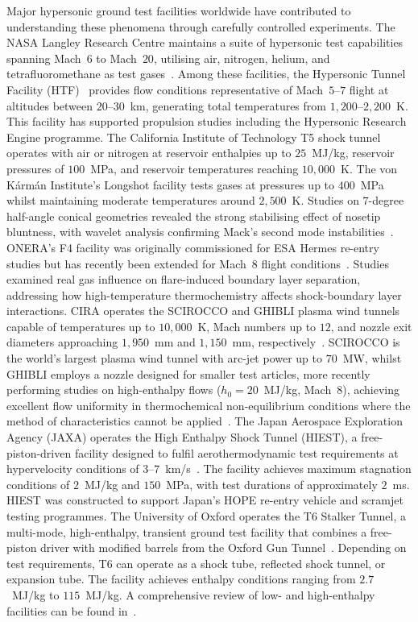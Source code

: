 Major hypersonic ground test facilities worldwide have contributed to understanding these phenomena through carefully controlled experiments. The \gls{NASA} Langley Research Centre maintains a suite of hypersonic test capabilities spanning Mach~$6$ to Mach~$20$, utilising air, nitrogen, helium, and tetrafluoromethane as test gases~\citep{BergerEtAl2015}. Among these facilities, the Hypersonic Tunnel Facility (HTF)~\citep{ThomasEtAl2010} provides flow conditions representative of Mach~$5$--$7$ flight at altitudes between $20$--$30$~km, generating total temperatures from $1{,}200$--$2{,}200$~K. This facility has supported propulsion studies including the Hypersonic Research Engine programme. The California Institute of Technology T5 shock tunnel~\citep{ParzialeEtAl2013} operates with air or nitrogen at reservoir enthalpies up to $25$~MJ/kg, reservoir pressures of $100$~MPa, and reservoir temperatures reaching $10{,}000$~K. The von K\'{a}rm\'{a}n Institute's Longshot facility tests gases at pressures up to $400$~MPa whilst maintaining moderate temperatures around $2{,}500$~K. Studies on $7$-degree half-angle conical geometries revealed the strong stabilising effect of nosetip bluntness, with wavelet analysis confirming Mack's second mode instabilities~\citep{Grossir2015}. ONERA's F4 facility was originally commissioned for ESA Hermes re-entry studies but has recently been extended for Mach~$8$ flight conditions~\citep{ViguierEtAl2012}. Studies examined real gas influence on flare-induced boundary layer separation, addressing how high-temperature thermochemistry affects shock-boundary layer interactions. CIRA operates the SCIROCCO and GHIBLI plasma wind tunnels capable of temperatures up to $10{,}000$~K, Mach numbers up to $12$, and nozzle exit diameters approaching $1{,}950$~mm and $1{,}150$~mm, respectively~\citep{DeFilippoEtAl2002}. SCIROCCO is the world's largest plasma wind tunnel with arc-jet power up to $70$~MW, whilst GHIBLI employs a nozzle designed for smaller test articles, more recently performing studies on high-enthalpy flows ($h_{0}=20$~MJ/kg, Mach~$8$), achieving excellent flow uniformity in thermochemical non-equilibrium conditions where the method of characteristics cannot be applied~\citep{GuidaSmoraldiSchettino2024}. The Japan Aerospace Exploration Agency (JAXA) operates the High Enthalpy Shock Tunnel (HIEST), a free-piston-driven facility designed to fulfil aerothermodynamic test requirements at hypervelocity conditions of $3$--$7$~km/s~\citep{ItohEtAl2002}. The facility achieves maximum stagnation conditions of $2$~MJ/kg and $150$~MPa, with test durations of approximately $2$~ms. HIEST was constructed to support Japan's HOPE re-entry vehicle and scramjet testing programmes. The University of Oxford operates the T6 Stalker Tunnel, a multi-mode, high-enthalpy, transient ground test facility that combines a free-piston driver with modified barrels from the Oxford Gun Tunnel~\citep{CollenEtAl2021}. Depending on test requirements, T6 can operate as a shock tube, reflected shock tunnel, or expansion tube. The facility achieves enthalpy conditions ranging from $2.7$~MJ/kg to $115$~MJ/kg. A comprehensive review of low- and high-enthalpy facilities can be found in~\cite{Grossir2015}.


